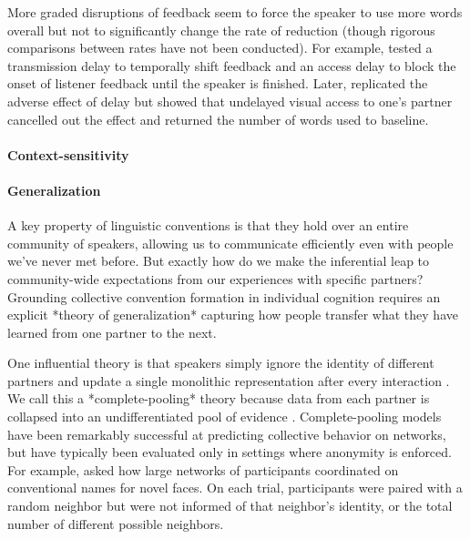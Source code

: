 More graded disruptions of feedback seem to force the speaker to use more words overall but not to significantly change the rate of reduction (though rigorous comparisons between rates have not been conducted). For example,  tested a transmission delay to temporally shift feedback and an access delay to block the onset of listener feedback until the speaker is finished. Later,  replicated the adverse effect of delay but showed that undelayed visual access to one's partner cancelled out the effect and returned the number of words used to baseline. 

\paragraph{Context-sensitivity}

\paragraph{Generalization}

A key property of linguistic conventions is that they hold over an entire community of speakers, allowing us to communicate efficiently even with people we've never met before.
But exactly how do we make the inferential leap to community-wide expectations from our experiences with specific partners? 
Grounding collective convention formation in individual cognition requires an explicit *theory of generalization* capturing how people transfer what they have learned from one partner to the next.

One influential theory is that speakers simply ignore the identity of different partners and update a single monolithic representation after every interaction \cite{steels_self-organizing_1995,barr_establishing_2004,young_evolution_2015}.
We call this a *complete-pooling* theory because data from each partner is collapsed into an undifferentiated pool of evidence \cite{gelman2006data}. 
Complete-pooling models have been remarkably successful at predicting collective behavior on networks, but have typically been evaluated only in settings where anonymity is enforced. 
For example,  asked how large networks of participants coordinated on conventional names for novel faces.
On each trial, participants were paired with a random neighbor but were not informed of that neighbor's identity, or the total number of different possible neighbors. 

